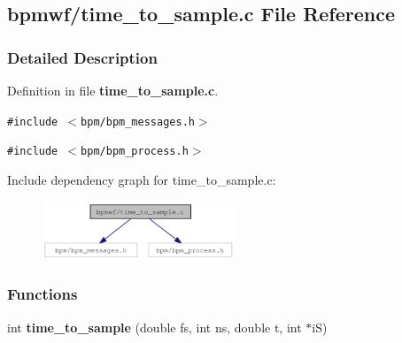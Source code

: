 \subsection{bpmwf/time\_\-to\_\-sample.c File Reference}
\label{time__to__sample_8c}


\subsubsection{Detailed Description}


Definition in file {\bf time\_\-to\_\-sample.c}.

{\tt \#include $<$bpm/bpm\_\-messages.h$>$}\par
{\tt \#include $<$bpm/bpm\_\-process.h$>$}\par


Include dependency graph for time\_\-to\_\-sample.c:\nopagebreak
\begin{figure}[H]
\begin{center}
\leavevmode
\includegraphics[width=162pt]{time__to__sample_8c__incl}
\end{center}
\end{figure}
\subsubsection*{Functions}
\begin{CompactItemize}
\item 
int \textbf{time\_\-to\_\-sample} (double fs, int ns, double t, int $\ast$iS)\label{group__wave_g97c0e95c3559f400c84603c768307544}

\end{CompactItemize}
